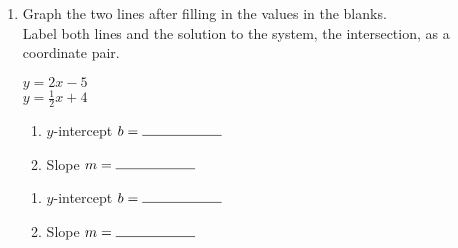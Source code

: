 \documentclass[12pt, twoside]{article}
\begin{document}
\begin{enumerate}
\begin{multicols}{2}
          Line: \hspace{1cm} Solid ($=$) \hspace{0.5cm} Dashed ($\neq$)\\[0.5cm]
          Shading: \hspace{0.3cm} Above ($y>$) \hspace{0.25cm} Below ($y<$)
        \end{multicols}

\newpage
    \item Graph the two lines after filling in the values in the blanks.\\[0.5cm]
    Label both lines and the solution to the system, the intersection, as a coordinate pair.\\

      \begin{multicols}{2}
        $y=2 x -5$ \\
        $y=\frac{1}{2} x +4$
      \end{multicols}
      \begin{multicols}{2}
        \raggedcolumns
        \begin{enumerate}
          \item $y$-intercept $b= \rule{2cm}{0.15mm}$ \\[0.5cm]
          \item Slope \hspace{0.7cm} $m= \rule{2cm}{0.15mm}$\\[0.5cm]
        \end{enumerate}
        \begin{enumerate}
          \item $y$-intercept $b= \rule{2cm}{0.15mm}$ \\[0.5cm]
          \item Slope \hspace{0.7cm} $m= \rule{2cm}{0.15mm}$\\[0.5cm]
        \end{enumerate}
      \end{multicols}

      \begin{center} %
      \end{center}

\end{enumerate}
\newpage
\end{document}
